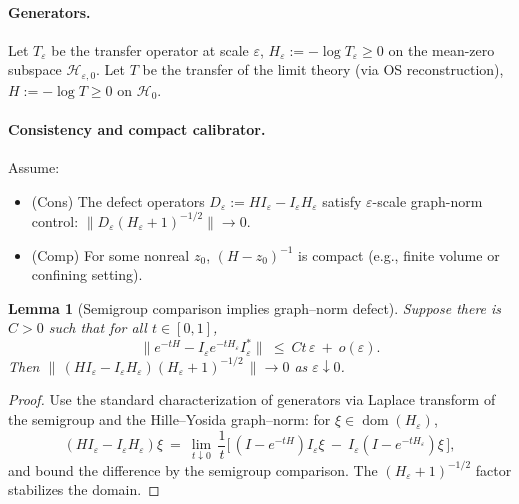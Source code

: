 \documentclass[11pt]{amsart}
\theoremstyle{plain}
\newtheorem{lemma}[theorem]{Lemma}
\theoremstyle{definition}
\theoremstyle{remark}
\begin{document}
\paragraph{Generators.}
Let $T_{\varepsilon}$ be the transfer operator at scale $\varepsilon$, $H_{\varepsilon}:=-\log T_{\varepsilon}\ge 0$ on the mean-zero subspace $\mathcal H_{\varepsilon,0}$. Let $T$ be the transfer of the limit theory (via OS reconstruction), $H:=-\log T\ge 0$ on $\mathcal H_0$.

\paragraph{Consistency and compact calibrator.}
Assume:
\begin{itemize}
  \item (Cons) The defect operators $D_{\varepsilon}:=H I_{\varepsilon}-I_{\varepsilon} H_{\varepsilon}$ satisfy $\varepsilon$-scale graph-norm control: $\|D_{\varepsilon}(H_{\varepsilon}+1)^{-1/2}\|\to 0$.
  \item (Comp) For some nonreal $z_0$, $(H-z_0)^{-1}$ is compact (e.g., finite volume or confining setting).
\end{itemize}

\begin{lemma}[Semigroup comparison implies graph–norm defect]
Suppose there is $C>0$ such that for all $t\in[0,1]$,
\[
  \bigl\|e^{-tH}-I_{\varepsilon}e^{-tH_{\varepsilon}}I_{\varepsilon}^*\bigr\|\ \le\ C t\,\varepsilon\ +\ o(\varepsilon).
\]
Then $\|\,(H I_{\varepsilon}-I_{\varepsilon} H_{\varepsilon})(H_{\varepsilon}+1)^{-1/2}\,\|\to 0$ as $\varepsilon\downarrow 0$.
\end{lemma}

\begin{proof}
Use the standard characterization of generators via Laplace transform of the semigroup and the Hille–Yosida graph–norm: for $\xi\in\operatorname{dom}(H_{\varepsilon})$,
\[
  (H I_{\varepsilon}-I_{\varepsilon} H_{\varepsilon})\xi\ =\ \lim_{t\downarrow 0}\,\frac{1}{t}\bigl[\,(I-e^{-tH})I_{\varepsilon}\xi\ -\ I_{\varepsilon}(I-e^{-tH_{\varepsilon}})\xi\,\bigr],
\]
and bound the difference by the semigroup comparison. The $(H_{\varepsilon}+1)^{-1/2}$ factor stabilizes the domain.
\end{proof}
\end{document}
